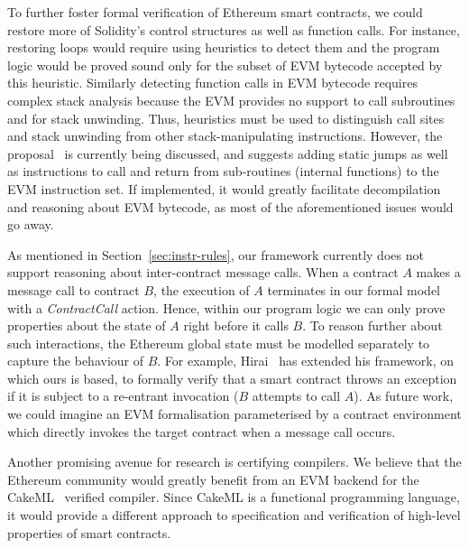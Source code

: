 \documentclass[sigplan,10pt]{acmart}\settopmatter{printfolios=true,printccs=false,printacmref=false}
\begin{document}
To further foster formal verification of Ethereum smart contracts, we
could restore more of Solidity's control structures as well as function calls.
For instance, restoring loops would require using heuristics
to detect them and the program logic would be proved sound only
for the subset of EVM bytecode accepted by this heuristic.
Similarly detecting function calls in EVM bytecode requires
complex stack analysis because the EVM provides no support to call
subroutines and for stack unwinding.
Thus, heuristics must be used to distinguish call sites and
stack unwinding from other stack-manipulating instructions.
However, the proposal~\cite{subroutines} is currently being discussed, and 
suggests adding static jumps as well as instructions to call and
return from sub-routines (internal functions) to the EVM instruction set.
If implemented, it would greatly facilitate
decompilation and reasoning about EVM bytecode, as most of the aforementioned
issues would go away.

As mentioned in Section~\ref{sec:instr-rules}, our framework currently does not support reasoning about inter-contract message calls.
When a contract $A$ makes a message call to contract $B$,
the execution of $A$ terminates in our formal model with a \textit{ContractCall} action.
Hence, within our program logic we can only prove properties
about the state of $A$ right before it calls $B$.
To reason further about such interactions, the Ethereum global state %
must be modelled separately to capture the behaviour of $B$.
For example, Hirai~\cite{Yoichi} has extended his framework,
on which ours is based, to formally verify that a smart contract
throws an exception if it is subject to a re-entrant invocation
($B$ attempts to call $A$).
As future work, we could imagine an EVM formalisation parameterised by
a contract environment which directly invokes the target contract
when a message call occurs.

Another promising avenue for research is certifying compilers.
We believe that the Ethereum community
would greatly benefit from an EVM backend for the CakeML~\cite{Owens_NKMT_17}
verified compiler.
Since CakeML is a functional programming language, it would
provide a different approach to specification and verification of high-level properties
of smart contracts.


\end{document}

